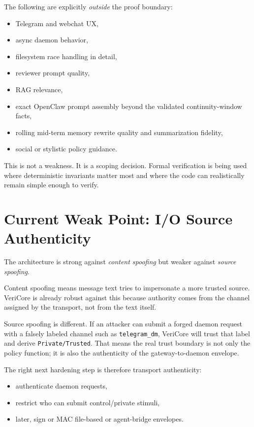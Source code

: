 \documentclass[11pt]{article}
\begin{document}
The following are explicitly \emph{outside} the proof boundary:
\begin{itemize}[leftmargin=1.5em]
\item Telegram and webchat UX,
\item async daemon behavior,
\item filesystem race handling in detail,
\item reviewer prompt quality,
\item RAG relevance,
\item exact OpenClaw prompt assembly beyond the validated continuity-window facts,
\item rolling mid-term memory rewrite quality and summarization fidelity,
\item social or stylistic policy guidance.
\end{itemize}

This is not a weakness. It is a scoping decision. Formal verification is being used where deterministic invariants matter most and where the code can realistically remain simple enough to verify.

\section{Current Weak Point: I/O Source Authenticity}
The architecture is strong against \emph{content spoofing} but weaker against \emph{source spoofing}.

Content spoofing means message text tries to impersonate a more trusted source. VeriCore is already robust against this because authority comes from the channel assigned by the transport, not from the text itself.

Source spoofing is different. If an attacker can submit a forged daemon request with a falsely labeled channel such as \texttt{telegram\_dm}, VeriCore will trust that label and derive \texttt{Private/Trusted}. That means the real trust boundary is not only the policy function; it is also the authenticity of the gateway-to-daemon envelope.

The right next hardening step is therefore transport authenticity:
\begin{itemize}[leftmargin=1.5em]
\item authenticate daemon requests,
\item restrict who can submit control/private stimuli,
\item later, sign or MAC file-based or agent-bridge envelopes.
\end{itemize}
\end{document}
